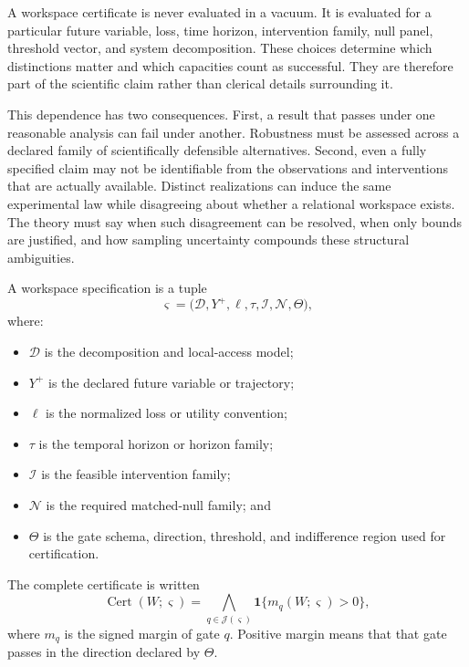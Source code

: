 
A workspace certificate is never evaluated in a vacuum. It is evaluated for a
particular future variable, loss, time horizon, intervention family, null
panel, threshold vector, and system decomposition. These choices determine
which distinctions matter and which capacities count as successful. They are
therefore part of the scientific claim rather than clerical details surrounding
it.

This dependence has two consequences. First, a result that passes under one
reasonable analysis can fail under another. Robustness must be assessed across
a declared family of scientifically defensible alternatives. Second, even a
fully specified claim may not be identifiable from the observations and
interventions that are actually available. Distinct realizations can induce the
same experimental law while disagreeing about whether a relational workspace
exists. The theory must say when such disagreement can be resolved, when only
bounds are justified, and how sampling uncertainty compounds these structural
ambiguities.


\begin{definition}\label{def:workspace-specification}
A workspace specification is a tuple
\[
\boxed{
\varsigma
=
\bigl(
\mathcal D,
Y^+,
\ell,
\tau,
\mathcal I,
\mathcal N,
\Theta
\bigr),
}
\]
where:
\begin{itemize}
\item \(\mathcal D\) is the decomposition and local-access model;
\item \(Y^+\) is the declared future variable or trajectory;
\item \(\ell\) is the normalized loss or utility convention;
\item \(\tau\) is the temporal horizon or horizon family;
\item \(\mathcal I\) is the feasible intervention family;
\item \(\mathcal N\) is the required matched-null family; and
\item \(\Theta\) is the gate schema, direction, threshold, and indifference
 region used for certification.
\end{itemize}
The complete certificate is written
\[
\operatorname{Cert}(W;\varsigma)
=
\bigwedge_{q\in\mathcal J(\varsigma)}
\mathbf 1\{m_q(W;\varsigma)>0\},
\]
where \(m_q\) is the signed margin of gate \(q\). Positive margin means that
that gate passes in the direction declared by \(\Theta\).
\end{definition}

